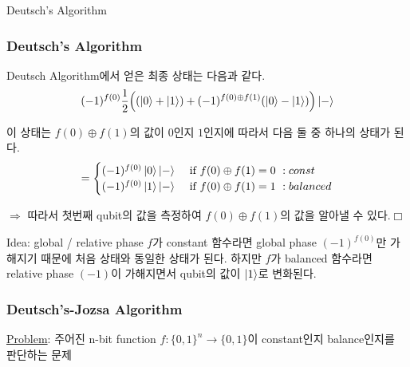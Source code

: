 \documentclass[9pt]{beamer}
\begin{document}
\begin{section}{Deutsch's Algorithm}
        \begin{frame}
            \frametitle{Deutsch's Algorithm}
            Deutsch Algorithm에서 얻은 최종 상태는 다음과 같다.
            $$ (-1)^{f(0)} \frac{1}{2} \Big((\ket 0 + \ket 1) + (-1)^{f(0) \oplus f(1)}(\ket 0 - \ket 1)\Big) \ket - $$

            이 상태는 $f(0) \oplus f(1)$의 값이 $0$인지 $1$인지에 따라서 다음 둘 중 하나의 상태가 된다.
            $$= \begin{cases} (-1)^{f(0)}\ket 0 \ket - & \text { if } f(0)\oplus f(1)=0\ :const \\ (-1)^{f(0)}\ket 1 \ket - & \text { if } f(0)\oplus f(1)=1\ :balanced\end{cases}$$
            
            \vspace{0.5cm}
            $\Rightarrow$ 따라서 첫번째 qubit의 값을 측정하여 $f(0)\oplus f(1)$의 값을 알아낼 수 있다.$\Box$
            
            \vspace{0.4cm}

            \begin{alertblock}{Idea: global / relative phase}
                $f$가 constant 함수라면 global phase $(-1)^{f(0)}$만 가해지기 때문에 처음 상태와 동일한 상태가 된다. 하지만 $f$가 balanced 함수라면 relative phase $(-1)$이 가해지면서 qubit의 값이 $\ket 1$로 변화된다.
            \end{alertblock}
        \end{frame}


        \begin{frame}
            \frametitle{Deutsch's-Jozsa Algorithm}
            \underline{Problem}: 주어진 n-bit function $f: \{0, 1\}^n \rightarrow \{0, 1\}$이 constant인지 balance인지를 판단하는 문제
            \vspace{0.2cm}


\end{frame}
\end{section}
\end{document}
